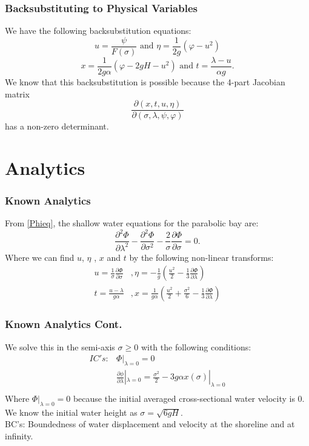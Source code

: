\documentclass[xcolor=dvipsnames]{beamer}
\begin{document}
\begin{frame}
\frametitle{Backsubstituting to Physical Variables}
We have the following backsubstitution equations:
\[
u = \frac{\psi}{F(\sigma)} \text{ and } \eta = \frac{1}{2g}\left(\varphi - u^2\right)
\]
\[
x = \frac{1}{2g\alpha} \left(\varphi - 2gH - u^2 \right) \text{ and } t = \frac{\lambda - u}{\alpha g}.
\]
We know that this backsubstitution is possible because the 4-part Jacobian matrix
\[
\frac{\partial (x,t,u,\eta)}{\partial (\sigma,\lambda,\psi,\varphi)}
\]
has a non-zero determinant.
\end{frame}

\section{Analytics}

\begin{frame}
\frametitle{Known Analytics}
From \eqref{Phieq}, the shallow water equations for the parabolic bay are: 
\[
\frac{\partial^2 \Phi}{\partial \lambda^2}-\frac{\partial^2 \Phi}{\partial \sigma^2}-\frac{2}{\sigma}\frac{\partial \Phi}{\partial \sigma}=0.
\]
Where we can find $u$, $\eta$ , $x$ and $t$ by the following non-linear transforms:\\
\begin{align*}
u=\frac{1}{\sigma}\frac{\partial \Phi}{\partial \sigma}&, \eta=-\frac{1}{g}\left(\frac{u^2}{2}-\frac{1}{3}\frac{\partial \Phi}{\partial \lambda}\right)\\
t=\frac{u-\lambda}{g\alpha}&,x=\frac{1}{g\alpha}\left(\frac{u^2}{2}+\frac{\sigma^2}{6}-\frac{1}{3}\frac{\partial \Phi}{\partial \lambda}\right)
\end{align*}
\end{frame}


\begin{frame}
\frametitle{Known Analytics Cont.}
We solve this in the semi-axis $\sigma \geq 0$ with the following conditions: \\
\begin{align*}
IC's:& \Phi|_{\lambda=0}=0\\
&\frac{\partial\phi}{\partial \lambda}|_{\lambda=0}=\frac{\sigma^2}{2}-3g\alpha x(\sigma)|_{\lambda=0}\\
\end{align*}
Where $\Phi|_{\lambda=0}=0$ because the initial averaged cross-sectional water velocity is 0. We know the initial water height as $\sigma=\sqrt{6gH}$.
\\ \vspace{3mm}
BC's: Boundedness of water displacement and velocity at the shoreline and at infinity.
\end{frame}
\end{document}

